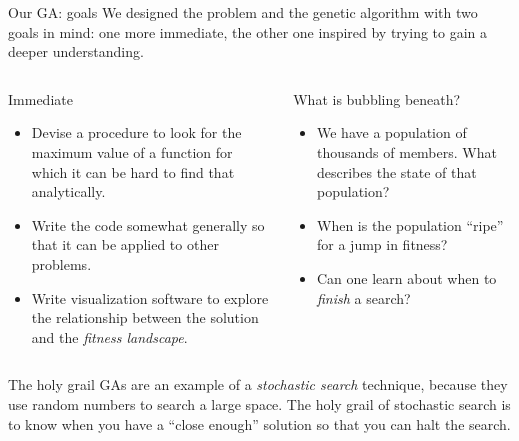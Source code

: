 \documentclass[handout,10pt,aspectratio=169]{beamer}
\begin{document}
\begin{frame}{Our GA: goals}
  We designed the problem and the genetic algorithm with two goals in
  mind: one more immediate, the other one inspired by trying to gain a
  deeper understanding.
  \vspace{-0.2cm}
  \begin{columns}[t]
    \begin{column}{0.5\textwidth}
      \begin{block}{Immediate}
        \begin{itemize}
          \pause\item
          Devise a procedure to look for the maximum value of a
          function for which it can be hard to find that analytically.\\
          \pause\item
          Write the code somewhat generally so that it can be applied
          to other problems.\\
          \pause\item
          Write visualization software to explore the relationship
          between the solution and the \emph{fitness landscape}.\\
        \end{itemize}
      \end{block}
    \end{column}
    \begin{column}{0.5\textwidth}
      \pause
      \begin{block}{What is bubbling beneath?}
        \begin{itemize}
          \pause\item
          We have a population of thousands of members.  What
          describes the state of that population?
          \pause\item
          When is the population ``ripe'' for a jump in fitness?
          \pause\item 
          Can one learn about when to \emph{finish} a search?
        \end{itemize}
      \end{block}
    \end{column}
  \end{columns}
  \pause
  \begin{block}{The holy grail}
    GAs are an example of a \emph{stochastic search} technique,
    because they use random numbers to search a large space.  The holy
    grail of stochastic search is to know when you have a ``close
    enough'' solution so that you can halt the search.
  \end{block}
\end{frame}
\end{document}
